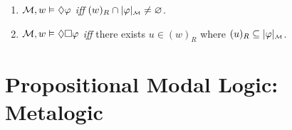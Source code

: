 \documentclass[a4paper, 11pt]{article} %
\begin{document}
\begin{enumerate}[leftmargin=1.2in,itemsep=1pt]
    \item $\M, w \MLmodels[] \Diamond\metaA$ \textit{iff} $(w)_R \cap \interpret{\M}{\metaA} \neq \varnothing$.
    \item $\M, w \MLmodels[] \Diamond\Box\metaA$ \textit{iff} there exists $u \in (w)_R$ where $(u)_R \subseteq \interpret{\M}{\metaA}$.
\end{enumerate}







\section*{\sc Propositional Modal Logic: Metalogic}
\end{document}
